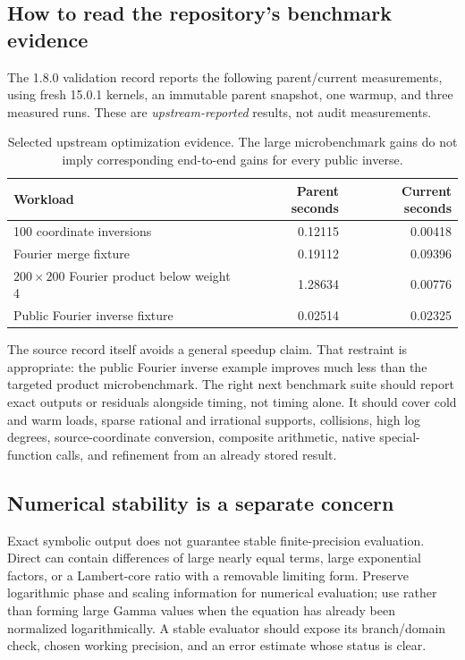\documentclass[11pt,a4paper]{article}
\newcommand{\code}[1]{\texttt{\detokenize{#1}}}
\begin{document}
\subsection{How to read the repository's benchmark evidence}
The 1.8.0 validation record reports the following parent/current measurements, using fresh 15.0.1 kernels, an immutable parent snapshot, one warmup, and three measured runs. These are \emph{upstream-reported} results, not audit measurements.\cite{repo-validation}
\begin{table}[htbp]\centering
\begin{tabular}{@{}p{}rr@{}}\toprule
Workload & Parent seconds & Current seconds\\\midrule
100 coordinate inversions & 0.12115 & 0.00418\\
Fourier merge fixture & 0.19112 & 0.09396\\
\(200\times200\) Fourier product below weight 4 & 1.28634 & 0.00776\\
Public Fourier inverse fixture & 0.02514 & 0.02325\\
\bottomrule\end{tabular}
\caption{Selected upstream optimization evidence. The large microbenchmark gains do not imply corresponding end-to-end gains for every public inverse.}
\end{table}
The source record itself avoids a general speedup claim. That restraint is appropriate: the public Fourier inverse example improves much less than the targeted product microbenchmark. The right next benchmark suite should report exact outputs or residuals alongside timing, not timing alone. It should cover cold and warm loads, sparse rational and irrational supports, collisions, high log degrees, source-coordinate conversion, composite arithmetic, native special-function calls, and refinement from an already stored result.

\subsection{Numerical stability is a separate concern}
Exact symbolic output does not guarantee stable finite-precision evaluation. Direct \code{Normal[s]} can contain differences of large nearly equal terms, large exponential factors, or a Lambert-core ratio with a removable limiting form. Preserve logarithmic phase and scaling information for numerical evaluation; use \code{LogGamma} rather than forming large Gamma values when the equation has already been normalized logarithmically. A stable evaluator should expose its branch/domain check, chosen working precision, and an error estimate whose status is clear.
\end{document}
